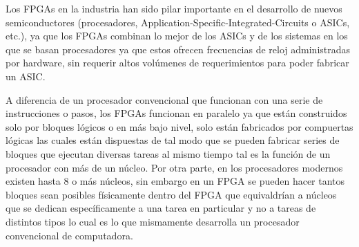 \documentclass[twoside,spanish,ESP,MSc]{plantillaLabUPV}
\theoremstyle{definition}
\newcommand{\f}{FPGA }
\newcommand{\fs}{FPGAs }
\begin{document}
Los \fs en la industria han sido pilar importante en el desarrollo de nuevos semiconductores (procesadores, Application-Specific-Integrated-Circuits o ASICs, etc.), ya que los \fs combinan lo mejor de los ASICs y de los sistemas en los que se basan procesadores ya que estos ofrecen frecuencias de reloj administradas por hardware, sin requerir altos volúmenes de requerimientos para poder fabricar un ASIC. %

A diferencia de un procesador convencional que funcionan con una serie de instrucciones o pasos, los \fs funcionan en paralelo ya que están construidos solo por bloques lógicos o en más bajo nivel, solo están fabricados por compuertas lógicas las cuales están dispuestas de tal modo que se pueden fabricar series de bloques que ejecutan diversas tareas al mismo tiempo tal es la función de un procesador con más de un núcleo. Por otra parte, en los procesadores modernos existen hasta 8 o más núcleos, sin embargo en un \f se pueden hacer tantos bloques sean posibles físicamente dentro del \f que equivaldrían a núcleos que se dedican específicamente a una tarea en particular y no a tareas de distintos tipos lo cual es lo que mismamente desarrolla un procesador convencional de computadora. \\

\end{document}

